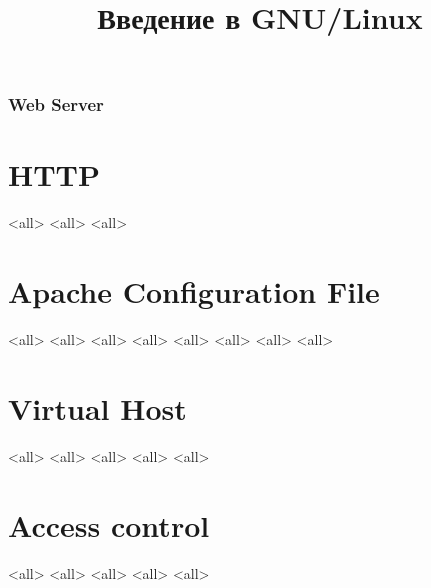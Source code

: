 

\title{Введение в GNU/Linux}




\begin{frame}
	\frametitle{Web Server}
	\titlepage
	\vspace{-0.5cm}
	\begin{center}
	\end{center}
\end{frame}


\begin{frame}
	\tableofcontents
	[hideallsubsections]
\end{frame}


\section{HTTP}
\mode<all>{}
\mode<all>{}
\mode<all>{}
\section{Apache Configuration File}
\mode<all>{}
\mode<all>{}
\mode<all>{}
\mode<all>{}
\mode<all>{}
\mode<all>{}
\mode<all>{}
\mode<all>{}
\section{Virtual Host}
\mode<all>{}
\mode<all>{}
\mode<all>{}
\mode<all>{}
\mode<all>{}
\section{Access control}
\mode<all>{}
\mode<all>{}
\mode<all>{}
\mode<all>{}
\mode<all>{}



